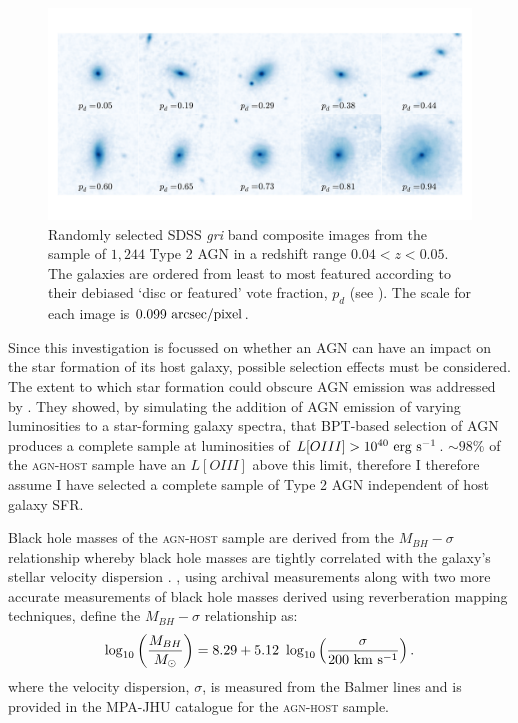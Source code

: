 \begin{figure}
\includegraphics[width=\textwidth]{agn/fig1.pdf}
\caption[SDSS images of galaxies in the \textsc{agn-host} sample]{Randomly selected SDSS \emph{gri} band composite images from the sample of $1,244$ Type 2 AGN in a redshift range $0.04 < z < 0.05$.  The galaxies are ordered from least to most featured according to their debiased `disc or featured' vote fraction, $p_d$ (see \citealt{GZ2}). The scale for each image is $0.099~\rm{arcsec/pixel}$.}
\label{mosaic}
\end{figure}

Since this investigation is focussed on whether an AGN can have an impact on the star formation of its host galaxy, possible selection effects must be considered. The extent to which star formation could obscure AGN emission was addressed by \cite{schawinski10a}. They showed, by simulating the addition of AGN emission of varying luminosities to a star-forming galaxy spectra, that BPT-based selection of AGN produces a complete sample at luminosities of $L[OIII] > 10^{40}~\rm{erg~s}^{-1}$. $\sim98\%$ of the \textsc{agn-host} sample have an $L[OIII]$ above this limit, therefore I therefore assume I have selected a complete sample of Type 2 AGN independent of host galaxy SFR. 

Black hole masses of the \textsc{agn-host} sample are derived from the $M_{BH}-\sigma$ relationship whereby black hole masses are tightly correlated with the galaxy's stellar velocity dispersion \citep{magorrian98, marconi03, haringrix04}. \citet{mcconnell11}, using archival measurements along with two more accurate measurements of black hole masses derived using reverberation mapping techniques, define the $M_{BH}-\sigma$ relationship as:
\begin{equation}
\log_{10}\left(\frac{M_{BH}}{M_{\odot}}\right) = 8.29 + 5.12 ~\log_{10}\left(\frac{\sigma}{200 ~\rm{km} ~s^{-1}}\right). 
\end{equation}
where the velocity dispersion, $\sigma$, is measured from the Balmer lines and is provided in the MPA-JHU catalogue \citep{kauffmann03, brinchmann04} for the \textsc{agn-host} sample.


